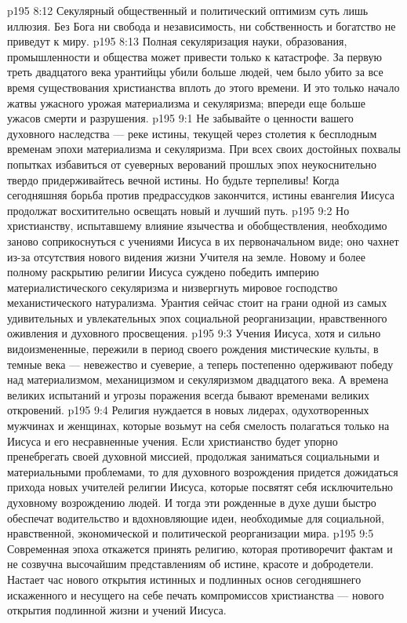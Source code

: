 \vs p195 8:12 Секулярный общественный и политический оптимизм суть лишь иллюзия. Без Бога ни свобода и независимость, ни собственность и богатство не приведут к миру.
\vs p195 8:13 Полная секуляризация науки, образования, промышленности и общества может привести только к катастрофе. За первую треть двадцатого века урантийцы убили больше людей, чем было убито за все время существования христианства вплоть до этого времени. И это только начало жатвы ужасного урожая материализма и секуляризма; впереди еще больше ужасов смерти и разрушения.
\vs p195 9:1 Не забывайте о ценности вашего духовного наследства --- реке истины, текущей через столетия к бесплодным временам эпохи материализма и секуляризма. При всех своих достойных похвалы попытках избавиться от суеверных верований прошлых эпох неукоснительно твердо придерживайтесь вечной истины. Но будьте терпеливы! Когда сегодняшняя борьба против предрассудков закончится, истины евангелия Иисуса продолжат восхитительно освещать новый и лучший путь.
\vs p195 9:2 Но христианству, испытавшему влияние язычества и обобществления, необходимо заново соприкоснуться с учениями Иисуса в их первоначальном виде; оно чахнет из\hyp{}за отсутствия нового видения жизни Учителя на земле. Новому и более полному раскрытию религии Иисуса суждено победить империю материалистического секуляризма и низвергнуть мировое господство механистического натурализма. Урантия сейчас стоит на грани одной из самых удивительных и увлекательных эпох социальной реорганизации, нравственного оживления и духовного просвещения.
\vs p195 9:3 Учения Иисуса, хотя и сильно видоизмененные, пережили в период своего рождения мистические культы, в темные века --- невежество и суеверие, а теперь постепенно одерживают победу над материализмом, механицизмом и секуляризмом двадцатого века. А времена великих испытаний и угрозы поражения всегда бывают временами великих откровений.
\vs p195 9:4 \pc Религия нуждается в новых лидерах, одухотворенных мужчинах и женщинах, которые возьмут на себя смелость полагаться только на Иисуса и его несравненные учения. Если христианство будет упорно пренебрегать своей духовной миссией, продолжая заниматься социальными и материальными проблемами, то для духовного возрождения придется дожидаться прихода новых учителей религии Иисуса, которые посвятят себя исключительно духовному возрождению людей. И тогда эти рожденные в духе души быстро обеспечат водительство и вдохновляющие идеи, необходимые для социальной, нравственной, экономической и политической реорганизации мира.
\vs p195 9:5 Современная эпоха откажется принять религию, которая противоречит фактам и не созвучна высочайшим представлениям об истине, красоте и добродетели. Настает час нового открытия истинных и подлинных основ сегодняшнего искаженного и несущего на себе печать компромиссов христианства --- нового открытия подлинной жизни и учений Иисуса.
